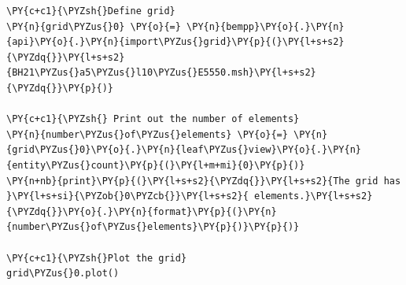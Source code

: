 \begin{tcolorbox}
\begin{Verbatim}[commandchars=\\\{\}]
\PY{c+c1}{\PYZsh{}Define grid}
\PY{n}{grid\PYZus{}0} \PY{o}{=} \PY{n}{bempp}\PY{o}{.}\PY{n}{api}\PY{o}{.}\PY{n}{import\PYZus{}grid}\PY{p}{(}\PY{l+s+s2}{\PYZdq{}}\PY{l+s+s2}{BH21\PYZus{}a5\PYZus{}l10\PYZus{}E5550.msh}\PY{l+s+s2}{\PYZdq{}}\PY{p}{)}
        
\PY{c+c1}{\PYZsh{} Print out the number of elements}
\PY{n}{number\PYZus{}of\PYZus{}elements} \PY{o}{=} \PY{n}{grid\PYZus{}0}\PY{o}{.}\PY{n}{leaf\PYZus{}view}\PY{o}{.}\PY{n}{entity\PYZus{}count}\PY{p}{(}\PY{l+m+mi}{0}\PY{p}{)}
\PY{n+nb}{print}\PY{p}{(}\PY{l+s+s2}{\PYZdq{}}\PY{l+s+s2}{The grid has }\PY{l+s+si}{\PYZob{}0\PYZcb{}}\PY{l+s+s2}{ elements.}\PY{l+s+s2}{\PYZdq{}}\PY{o}{.}\PY{n}{format}\PY{p}{(}\PY{n}{number\PYZus{}of\PYZus{}elements}\PY{p}{)}\PY{p}{)}
        
\PY{c+c1}{\PYZsh{}Plot the grid}
grid\PYZus{}0.plot()
\end{Verbatim}
\end{tcolorbox}

